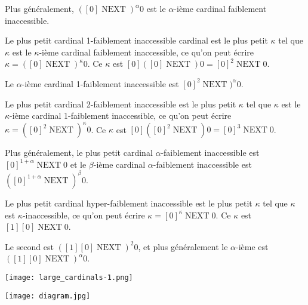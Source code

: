 \documentclass[12pt]{beamer}
\begin{document}
\begin{frame}

Plus généralement, \( ([0] \operatorname{NEXT})^\alpha 0 \) est le $\alpha$-ième cardinal faiblement inaccessible.

Le plus petit cardinal 1-faiblement inaccessible cardinal est le plus petit \( \kappa \) tel que  \( \kappa \) est le \(\kappa\)-ième cardinal faiblement inaccessible, ce qu'on peut écrire \( \kappa = ([0] \operatorname{NEXT})^\kappa 0 \). Ce \( \kappa \) est \( [0] ([0] \operatorname{NEXT}) 0 = [0]^2 \operatorname{NEXT} 0 \).

Le \(\alpha\)-ième cardinal 1-faiblement inaccessible est \( [0]^2 \operatorname{NEXT})^\alpha 0 \).

Le plus petit cardinal 2-faiblement inaccessible est le plus petit \( \kappa \) tel que \( \kappa \) est le \(\kappa\)-ième cardinal 1-faiblement inaccessible, ce qu'on peut écrire \( \kappa = ([0]^2 \operatorname{NEXT})^\kappa 0 \). Ce \( \kappa \) est \( [0] ([0]^2 \operatorname{NEXT}) 0 = [0]^3 \operatorname{NEXT} 0 \).

Plus généralement, le plus petit cardinal $\alpha$-faiblement inaccessible est \( [0]^{1+\alpha} \operatorname{NEXT} 0  \) et le \(\beta\)-ième cardinal \(\alpha\)-faiblement inaccessible est \( ([0]^{1+\alpha} \operatorname{NEXT})^\beta 0 \).

\end{frame}
\begin{frame}

Le plus petit cardinal hyper-faiblement inaccessible est le plus petit \( \kappa \) tel que \( \kappa \) est \(\kappa\)-inaccessible, ce qu'on peut écrire \( \kappa = [0]^\kappa \operatorname{NEXT} 0 \). Ce \( \kappa \) est \( [1] [0] \operatorname{NEXT} 0 \).

Le second est \( ([1] [0] \operatorname{NEXT})^2 0 \), et plus généralement le \(\alpha\)-ième est \( ([1] [0] \operatorname{NEXT})^\alpha 0 \).

\end{frame}
\begin{frame}

\texttt{[image: large\_cardinals-1.png]}

\end{frame}
\begin{frame}

\texttt{[image: diagram.jpg]}

\end{frame}
\end{document}
